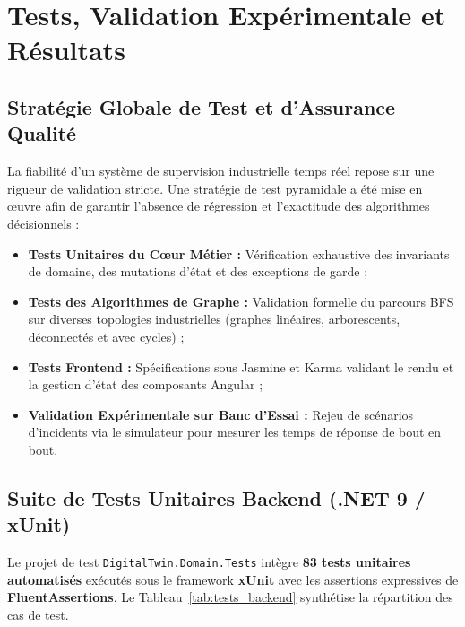 ﻿\chapter{Tests, Validation Expérimentale et Résultats}

\section{Stratégie Globale de Test et d'Assurance Qualité}

La fiabilité d'un système de supervision industrielle temps réel repose sur une rigueur de validation stricte. Une stratégie de test pyramidale a été mise en œuvre afin de garantir l'absence de régression et l'exactitude des algorithmes décisionnels :

\begin{itemize}
    \item \textbf{Tests Unitaires du Cœur Métier :} Vérification exhaustive des invariants de domaine, des mutations d'état et des exceptions de garde ;
    \item \textbf{Tests des Algorithmes de Graphe :} Validation formelle du parcours BFS sur diverses topologies industrielles (graphes linéaires, arborescents, déconnectés et avec cycles) ;
    \item \textbf{Tests Frontend :} Spécifications sous Jasmine et Karma validant le rendu et la gestion d'état des composants Angular ;
    \item \textbf{Validation Expérimentale sur Banc d'Essai :} Rejeu de scénarios d'incidents via le simulateur pour mesurer les temps de réponse de bout en bout.
\end{itemize}

\section{Suite de Tests Unitaires Backend (.NET 9 / xUnit)}

Le projet de test \texttt{DigitalTwin.Domain.Tests} intègre \textbf{83 tests unitaires automatisés} exécutés sous le framework \textbf{xUnit} avec les assertions expressives de \textbf{FluentAssertions}. Le Tableau~\ref{tab:tests_backend} synthétise la répartition des cas de test.

